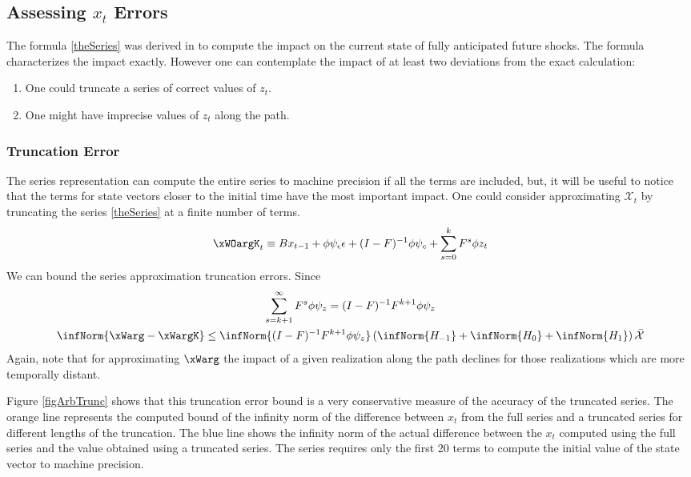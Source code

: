 \documentclass[12pt]{article}
\begin{document}
\subsection{Assessing $x_t$ Errors}
\label{sec:truncationerr}
The formula \ref{theSeries} was derived in \citep{anderson10}
to compute the impact on the current state of fully anticipated future shocks.  The formula characterizes the impact exactly.  However one can contemplate the impact of at least two deviations from the exact calculation:
\begin{enumerate}
\item One could truncate a series of correct values of $z_t$.  
\item One might have imprecise values of $z_t$ along the path.
\end{enumerate}
\subsubsection{Truncation Error}


The series representation can compute the entire series to machine precision
if all the terms are included, but, it will be useful to notice that
the terms for state vectors closer 
to the initial time have the most important impact.
One could consider approximating  $\mathcal{X}_t$ by 
truncating the series \ref{theSeries} at a finite number of terms.
 	 \begin{gather}
 	 \xWOargK_t \equiv B x_{t-1}+ \phi \psi_\epsilon\epsilon  + (I - F)^{-1} \phi \psi_c + \sum_{s=0}^k F^s \phi z_{t}\label{theTruncSeries}
 \end{gather}
We can bound the  series approximation truncation errors.
Since
    \begin{gather}
      \label{eq:1}
\sum_{s=k+1}^{\infty} F^s \phi \psi_z = (I -F)^{-1} F^{k+1}\phi \psi_z       \\
\infNorm{\xWarg-\xWargK} \le \infNorm{(I -F)^{-1} F^{k+1}\phi \psi_z} \left ( \infNorm{H_{-1} }+ \infNorm{H_{0} }+ \infNorm{H_{1} } \right )\bar{\mathcal{X}}
    \end{gather}
Again, note that for approximating $\xWarg$ the impact of  a given realization along the path declines for those realizations which are  more temporally distant.

 Figure \ref{figArbTrunc} shows
that this truncation error bound is a very conservative measure of the accuracy
of the truncated series.  The orange line represents the computed bound of
the infinity norm of the difference between $x_t$ from the full series and a truncated series for different lengths of the truncation.  The blue line shows the infinity norm of the actual difference between the $x_t$ computed using the full series and the value obtained using a truncated series.  The series requires only the first 20 terms to compute
the initial value of the state vector to machine precision. 
\end{document}
